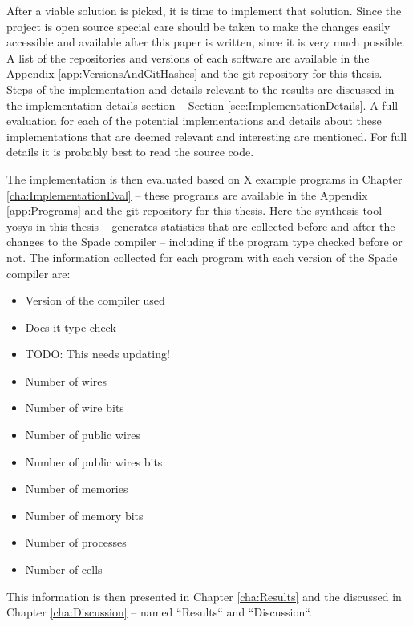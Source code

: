 \documentclass[msc,lith,english]{liuthesis}
\begin{document}
After a viable solution is picked, it is time to implement that solution. Since the project is open source special care should be taken to make the changes easily accessible and available after this paper is written, since it is very much possible. A list of the repositories and versions of each software are available in the Appendix \ref{app:VersionsAndGitHashes} and the \href{https://github.com/FredTheDino/thesis-spade-lang}{git-repository for this thesis}. Steps of the implementation and details relevant to the results are discussed in the implementation details section -- Section \ref{sec:ImplementationDetails}. A full evaluation for each of the potential implementations and details about these implementations that are deemed relevant and interesting are mentioned. For full details it is probably best to read the source code. 

The implementation is then evaluated based on X example programs in Chapter \ref{cha:ImplementationEval} -- these programs are available in the Appendix \ref{app:Programs} and the \href{https://github.com/FredTheDino/thesis-spade-lang}{git-repository for this thesis}. Here the synthesis tool -- yosys in this thesis -- generates statistics that are collected before and after the changes to the Spade compiler -- including if the program type checked before or not. The information collected for each program with each version of the Spade compiler are:

\begin{itemize}
    \setlength\itemsep{0.5em}
    \item Version of the compiler used
    \item Does it type check
    \item TODO: This needs updating!
    \item Number of wires
    \item Number of wire bits
    \item Number of public wires
    \item Number of public wires bits
    \item Number of memories
    \item Number of memory bits
    \item Number of processes
    \item Number of cells
\end{itemize}
This information is then presented in Chapter \ref{cha:Results} and the discussed in Chapter \ref{cha:Discussion} -- named ``Results`` and ``Discussion``.
\end{document}
